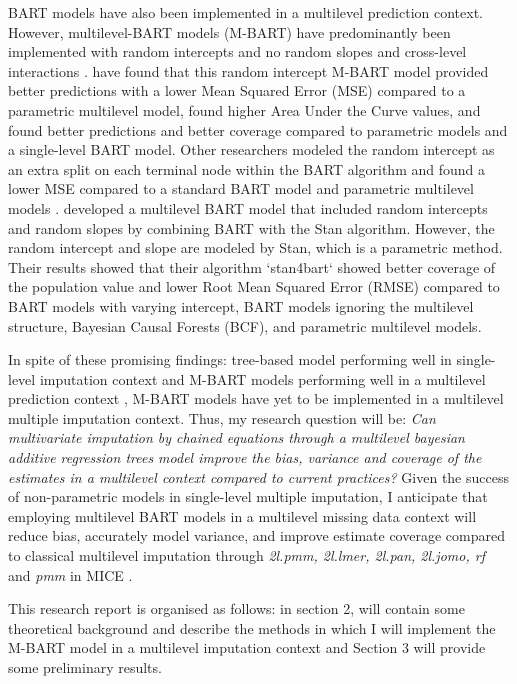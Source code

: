 \documentclass[10pt, a4paper, titlepage]{article}
\begin{document}
BART models have also been implemented in a multilevel prediction context. However, multilevel-BART models (M-BART) have predominantly been implemented with random intercepts and no random slopes and cross-level interactions \citep{chen2020, wagner2020, tan2016, wundervald2022}. \citet{wagner2020} have found that this random intercept M-BART model provided better predictions with a lower Mean Squared Error (MSE) compared to a parametric multilevel model, \citet{tan2016} found higher Area Under the Curve values, and \citet{chen2020} found better predictions and better coverage compared to parametric models and a single-level BART model. Other researchers modeled the random intercept as an extra split on each terminal node within the BART algorithm and found a lower MSE compared to a standard BART model and parametric multilevel models \citep{wundervald2022}. \citet{dorie2022} developed a multilevel BART model that included random intercepts and random slopes by combining BART with the Stan algorithm. However, the random intercept and slope are modeled by Stan, which is a parametric method. Their results showed that their algorithm `stan4bart` showed better coverage of the population value and lower Root Mean Squared Error (RMSE) compared to BART models with varying intercept, BART models ignoring the multilevel structure, Bayesian Causal Forests (BCF), and parametric multilevel models.

In spite of these promising findings: tree-based model performing well in single-level imputation context \citep{burgette2010, xu2016, silva2022, stekhoven2012, waljee2013} and M-BART models performing well in a multilevel prediction context \citep{chen2020, wagner2020, tan2016, wundervald2022, dorie2022}, M-BART models have yet to be implemented in a multilevel multiple imputation context. Thus, my research question will be: \textit{Can multivariate imputation by chained equations through a multilevel bayesian additive regression trees model improve the bias, variance and coverage of the estimates in a multilevel context compared to current practices?} Given the success of non-parametric models in single-level multiple imputation, I anticipate that employing multilevel BART models in a multilevel missing data context will reduce bias, accurately model variance, and improve estimate coverage compared to classical multilevel imputation through \textit{2l.pmm, 2l.lmer, 2l.pan, 2l.jomo, rf} and \textit{pmm} in MICE \citep{buuren2011}.

This research report is organised as follows: in section 2, will contain some theoretical background and describe the methods in which I will implement the M-BART model in a multilevel imputation context and Section 3 will provide some preliminary results.
\end{document}
